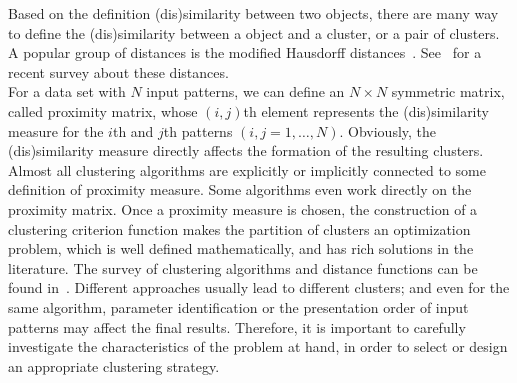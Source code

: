 Based on the definition (dis)similarity between two objects, there are many way to define the (dis)similarity between a object and a cluster, or a pair of clusters. A popular group of distances is the modified Hausdorff distances~\cite{dubuisson1994modified}. See~\cite{zhang2008identifying} for a recent survey about these distances. 
\\For a data set with $N$ input patterns, we can define an $N \times N$ symmetric matrix, called proximity matrix, whose $(i,j)$th element represents the (dis)similarity measure for the $i$th and $j$th patterns $(i,j = 1, \ldots, N)$. Obviously, the (dis)similarity measure directly affects the formation of the resulting clusters. Almost all clustering algorithms are explicitly
or implicitly connected to some definition of proximity measure. Some algorithms even work directly on the proximity matrix. Once
a proximity measure is chosen, the construction of a clustering criterion function makes the partition of clusters an optimization problem, which is well defined mathematically, and has rich solutions in the literature. The survey of clustering algorithms and distance functions can be found in~\cite{xu2005survey, rai2010survey}. Different approaches usually lead to different clusters; and even for the same algorithm, parameter identification or the presentation order of input patterns may affect the final results. Therefore, it is important to carefully investigate the characteristics of the problem at hand, in order to select or design an appropriate clustering strategy.

